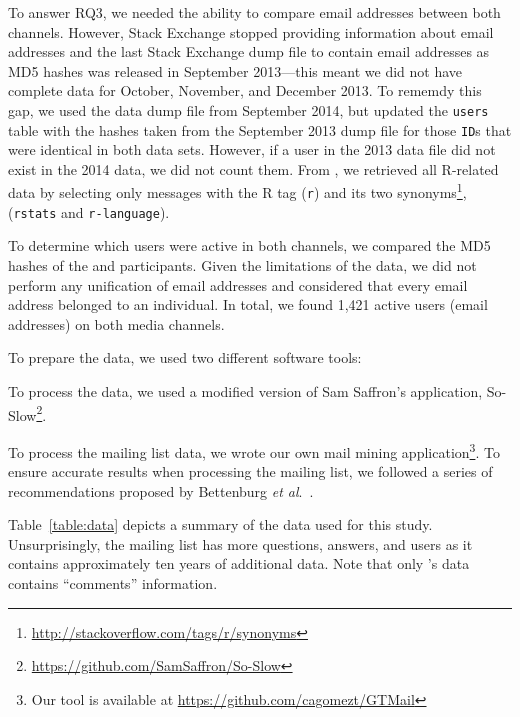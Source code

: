    
To answer RQ3, we needed the ability to compare email addresses between both channels. However, Stack Exchange stopped providing information about email addresses and the last Stack Exchange dump file to contain email addresses as MD5 hashes was released in September 2013---this meant we did not have complete data for October, November, and December 2013. 
To rememdy this gap, we used the data dump file from September 2014, but updated the \texttt{users} table with the hashes taken from the September 2013 dump file for those \texttt{ID}s that were identical in both data sets.
However, if a user in the 2013 data file did not exist in the 2014 data, we did not count them.
From \SO, we retrieved all R-related data by selecting only messages with the R tag (\texttt{r}) and its two synonyms\footnote{\url{http://stackoverflow.com/tags/r/synonyms}}, (\texttt{rstats} and \texttt{r-language}).

To determine which users were active in both channels, we compared the MD5 hashes of the \RH and \SO participants. Given the limitations of the \SO data, we did not perform any unification of email addresses and considered that every email address belonged to an individual. In total, we found 1,421 active users (email addresses) on both media channels.


To prepare the data, we used two different software tools:
    \begin{enumerate*}[label=(\arabic*)]
    \item To process the \SO data, we used a modified version of Sam Saffron's application, So-Slow\footnote{\url{https://github.com/SamSaffron/So-Slow}}.
    \item To process the \RH mailing list data, we wrote our own mail mining application\footnote{Our tool is available at
            \url{https://github.com/cagomezt/GTMail}}. To ensure accurate results when processing the \RH mailing list, we followed a series of recommendations proposed by Bettenburg \textit{et al}.~\cite{Bettenburg2009}.
    \end{enumerate*}
Table~\ref{table:data} depicts a summary of the data used for this study. Unsurprisingly, the \RH mailing list has more questions, answers, and users as it contains approximately ten years of additional data.
Note that only \SO's data contains ``comments'' information.

